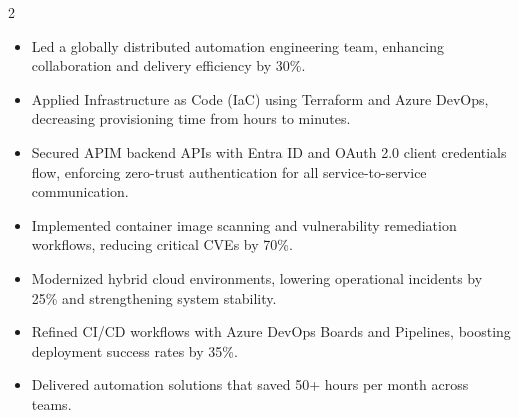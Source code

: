 \documentclass[10pt,a4paper,withhyper]{altacv}
\begin{document}
\begin{paracol}{2}
\begin{justify}
\begin{itemize}
\end{itemize}
\end{justify}
\divider

\begin{justify}
\begin{itemize}

    \item Led a globally distributed automation engineering team, enhancing collaboration and delivery efficiency by 30\%.
    \item Applied Infrastructure as Code (IaC) using Terraform and Azure DevOps, decreasing provisioning time from hours to minutes.
    \item Secured APIM backend APIs with Entra ID and OAuth 2.0 client credentials flow, enforcing zero-trust authentication for all service-to-service communication.
    \item Implemented container image scanning and vulnerability remediation workflows, reducing critical CVEs by 70\%.
    \item Modernized hybrid cloud environments, lowering operational incidents by 25\% and strengthening system stability.
    \item Refined CI/CD workflows with Azure DevOps Boards and Pipelines, boosting deployment success rates by 35\%.
    \item Delivered automation solutions that saved 50+ hours per month across teams.
    
\end{itemize}
\end{justify}
\divider

\begin{justify}
\begin{itemize}


\end{itemize}
\end{justify}
\end{paracol}
\end{document}
